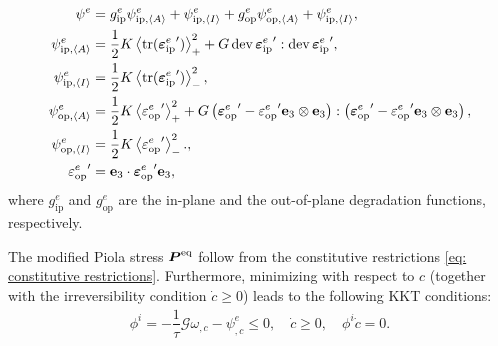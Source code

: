 \begin{subequations}
  \begin{align}
    \psi^e                            & =  g^e_\text{ip} \psi^e_{\text{ip}, {\left< A \right>}} + \psi^e_{\text{ip}, {\left< I \right>}} + g^e_\text{op} \psi^e_{\text{op}, {\left< A \right>}} + \psi^e_{\text{ip}, {\left< I \right>}},                                                                           \\
    \psi^e_{\text{ip}, {\left< A \right>}}   & = \dfrac{1}{2} K \left<\operatorname{tr}({\boldsymbol{\varepsilon}^e_\text{ip}}')\right>_+^2 + G \operatorname{dev}{{\boldsymbol{\varepsilon}^e_\text{ip}}'} : \operatorname{dev}{{\boldsymbol{\varepsilon}^e_\text{ip}}'},                                                                                                                        \\
    \psi^e_{\text{ip}, {\left< I \right>}} & = \dfrac{1}{2} K \left<\operatorname{tr}({\boldsymbol{\varepsilon}^e_\text{ip}}')\right>_-^2,                                                                                                                                                                                        \\
    \psi^e_{\text{op}, {\left< A \right>}}   & = \dfrac{1}{2} K \left<{\varepsilon^e_\text{op}}'\right>_+^2 + G \left( {\boldsymbol{\varepsilon}^e_\text{op}}' - {\varepsilon^e_\text{op}}' \textbf{e}_3 \otimes \textbf{e}_3 \right) : \left( {\boldsymbol{\varepsilon}^e_\text{op}}' - {\varepsilon^e_\text{op}}' \textbf{e}_3 \otimes \textbf{e}_3 \right), \\
    \psi^e_{\text{op}, {\left< I \right>}} & = \dfrac{1}{2} K \left<{\varepsilon^e_\text{op}}'\right>_-^2.,                                                                                                                                                                                        \\
    {\varepsilon^e_\text{op}}'        & = \textbf{e}_3 \cdot {\boldsymbol{\varepsilon}^e_\text{op}}' \textbf{e}_3,                                                                                                                                                                                                       
  \end{align}
\end{subequations}
where $g^e_\text{ip}$ and $g^e_\text{op}$ are the in-plane and the out-of-plane degradation functions, respectively.

The modified Piola stress $\boldsymbol{P}^\text{eq}$ follow from the constitutive restrictions \eqref{eq: constitutive restrictions}. Furthermore, minimizing with respect to $c$ (together with the irreversibility condition $\dot{c} \geqslant 0$) leads to the following KKT conditions:
\begin{align}
  \phi^i = - \dfrac{1}{\tau} \mathcal{G} \omega_{,c} - \psi^e_{,c} \leqslant 0, \quad \dot{c} \geqslant 0, \quad \phi^i \dot{c} = 0.
\end{align}

